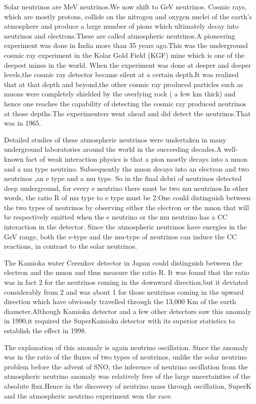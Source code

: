 Solar neutrinos are MeV neutrinos.We now shift to GeV neutrinos.
Cosmic rays, which are mostly protons, collide on the nitrogen
and oxygen nuclei of the earth's atmosphere and produce a large
number of pions which ultimately decay into neutrinos and
electrons.These are called atmospheric neutrinos.A pioneering
experiment was done in India more than 35 years ago.This was
the underground cosmic ray experiment in the Kolar Gold Field
(KGF) mine which is one of the deepest mines in the world.
When the experiment was done at deeper and deeper levels,the
cosmic ray detector became silent at a certain depth.It was
realized that at that depth and beyond,the other cosmic ray
produced particles such as muons were completely shielded by
the overlying rock ( a few km thick) and hence one reaches
the capability of detecting the cosmic ray produced neutrinos
at those depths.The experimenters went ahead and did detect
the neutrinos.That was in 1965.

Detailed studies of these atmospheric neutrinos were undertaken
in many underground laboratories around the world in the
succeeding decades.A well-known fact of weak interaction physics
is that a pion mostly decays into a muon and a mu type neutrino.
Subsequently the muon decays into an electron and two neutrinos
,an e type and a mu type. So in the final debri of neutrinos
detected deep underground, for every e neutrino there must be
two mu neutrinos.In other words, the ratio R of mu type to
e type must be 2.One could distinguish between the two types of
neutrinos by observing either the electron or the muon that
will be respectively emitted when the e neutrino or the mu neutrino
has a CC interaction in the detector. Since the atmospheric neutrinos
have energies in the GeV range, both the e-type and the mu-type
of neutrinos can induce the CC reactions, in contrast to the
solar neutrinos.

The Kamioka water Cerenkov detector in Japan could distinguish
between the electron and the muon and thus measure the ratio R. It was
found that the ratio was in fact 2 for the neutrinos coming in
the downward direction,but it deviated considerably from 2 and
was about 1 for those neutrinos coming in the upward direction
which have obviously travelled through the 13,000 Km of the
earth diameter.Although Kamioka detector and a few other
detectors saw this anomaly  in 1990,it required the SuperKamioka
detector with its superior statistics to establish the effect
in 1998.

The explanation of this anomaly is again neutrino oscillation.
Since the anomaly was in the ratio of the fluxes of two types
of neutrinos, unlike the solar neutrino problem before the advent
of SNO, the inference of neutrino oscillation from the atmospheric
neutrino anomaly was relatively free of the large uncertainties
of the absolute flux.Hence in the discovery of neutrino mass through
oscillation, SuperK and the atmospheric neutrino experiment won
the race.


